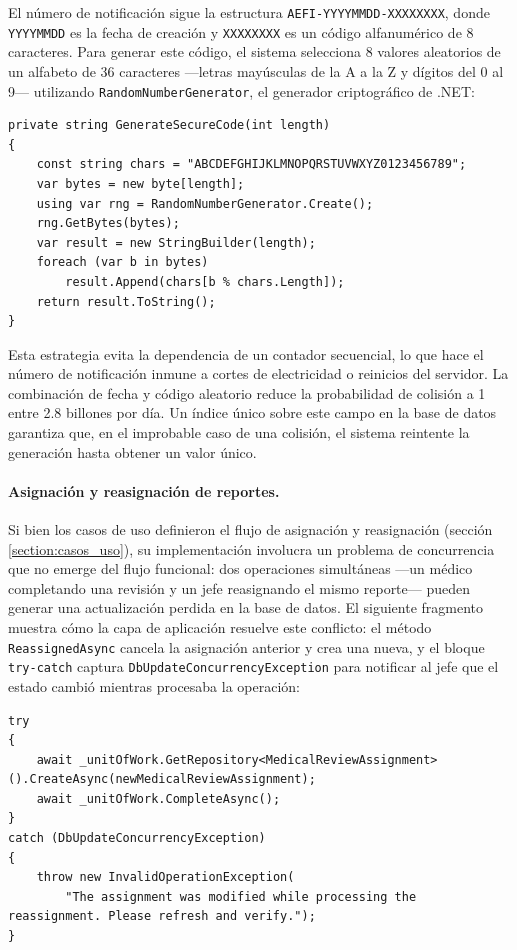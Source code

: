 El número de notificación sigue la estructura \texttt{AEFI-YYYYMMDD-XXXXXXXX}, donde \texttt{YYYYMMDD} es la fecha de creación y \texttt{XXXXXXXX} es un código alfanumérico de 8 caracteres. Para generar este código, el sistema selecciona 8 valores aleatorios de un alfabeto de 36 caracteres —letras mayúsculas de la A a la Z y dígitos del 0 al 9— utilizando \texttt{RandomNumberGenerator}, el generador criptográfico de .NET:

\begin{lstlisting}[language={[Sharp]C}, caption={Generación del código aleatorio del número de notificación}, label={lst:notification_number}]
private string GenerateSecureCode(int length)
{
    const string chars = "ABCDEFGHIJKLMNOPQRSTUVWXYZ0123456789";
    var bytes = new byte[length];
    using var rng = RandomNumberGenerator.Create();
    rng.GetBytes(bytes);
    var result = new StringBuilder(length);
    foreach (var b in bytes)
        result.Append(chars[b % chars.Length]);
    return result.ToString();
}
\end{lstlisting}

Esta estrategia evita la dependencia de un contador secuencial, lo que hace el número de notificación inmune a cortes de electricidad o reinicios del servidor. La combinación de fecha y código aleatorio reduce la probabilidad de colisión a 1 entre 2.8 billones por día. Un índice único sobre este campo en la base de datos garantiza que, en el improbable caso de una colisión, el sistema reintente la generación hasta obtener un valor único.

\paragraph{Asignación y reasignación de reportes.}

Si bien los casos de uso definieron el flujo de asignación y reasignación (sección \ref{section:casos_uso}), su implementación involucra un problema de concurrencia que no emerge del flujo funcional: dos operaciones simultáneas —un médico completando una revisión y un jefe reasignando el mismo reporte— pueden generar una actualización perdida en la base de datos.
El siguiente fragmento muestra cómo la capa de aplicación resuelve este conflicto: el método \texttt{ReassignedAsync} cancela la asignación anterior y crea una nueva, y el bloque \texttt{try-catch} captura \texttt{DbUpdateConcurrencyException} para notificar al jefe que el estado cambió mientras procesaba la operación:

\begin{lstlisting}[language={[Sharp]C}, caption={Manejo de concurrencia en la reasignación}, label={lst:reassign_concurrency}]
try
{
    await _unitOfWork.GetRepository<MedicalReviewAssignment>().CreateAsync(newMedicalReviewAssignment);
    await _unitOfWork.CompleteAsync();
}
catch (DbUpdateConcurrencyException)
{
    throw new InvalidOperationException(
        "The assignment was modified while processing the reassignment. Please refresh and verify.");
}
\end{lstlisting}

